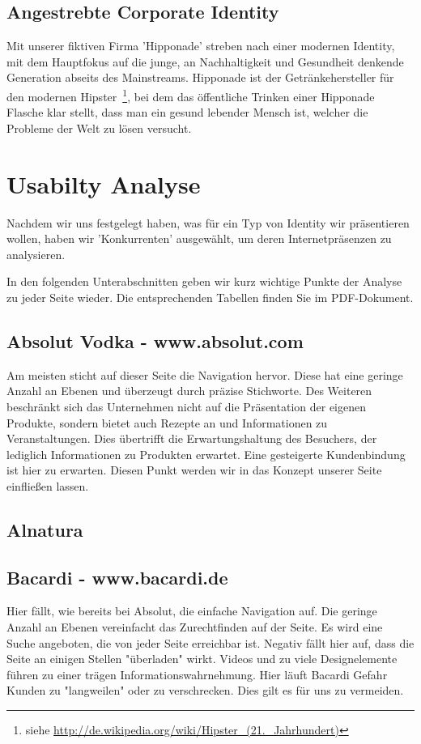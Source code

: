 \documentclass[12pt,a4paper,oneside,ngerman]{article}
\begin{document}
\subsection{Angestrebte Corporate Identity}
Mit unserer fiktiven Firma 'Hipponade' streben nach einer modernen Identity, mit dem Hauptfokus auf die junge, an Nachhaltigkeit und Gesundheit denkende Generation abseits des Mainstreams.
Hipponade ist der Getränkehersteller für den modernen Hipster~\footnote{siehe \url{http://de.wikipedia.org/wiki/Hipster_(21._Jahrhundert)}}, bei dem das öffentliche Trinken einer Hipponade Flasche klar stellt, dass man ein gesund lebender Mensch ist, welcher die Probleme der Welt zu lösen versucht.

\newpage %
\section{Usabilty Analyse} %
Nachdem wir uns festgelegt haben, was für ein Typ von Identity wir präsentieren wollen, haben wir 'Konkurrenten' ausgewählt, um deren Internetpräsenzen zu analysieren. 

In den folgenden Unterabschnitten geben wir kurz wichtige Punkte der Analyse zu jeder Seite wieder. Die entsprechenden Tabellen finden Sie im PDF-Dokument. %

\subsection{Absolut Vodka - www.absolut.com} %
Am meisten sticht auf dieser Seite die Navigation hervor. Diese hat eine geringe Anzahl an Ebenen und überzeugt durch präzise Stichworte. Des Weiteren beschränkt sich das Unternehmen nicht auf die Präsentation der eigenen Produkte, sondern bietet auch Rezepte an und Informationen zu Veranstaltungen. Dies übertrifft die Erwartungshaltung des Besuchers, der lediglich Informationen zu Produkten erwartet. Eine gesteigerte Kundenbindung ist hier zu erwarten. Diesen Punkt werden wir in das Konzept unserer Seite einfließen lassen.
\subsection{Alnatura} %

\subsection{Bacardi - www.bacardi.de} %
Hier fällt, wie bereits bei Absolut, die einfache Navigation auf. Die geringe Anzahl an Ebenen vereinfacht das Zurechtfinden auf der Seite. Es wird eine Suche angeboten, die von jeder Seite erreichbar ist. Negativ fällt hier auf, dass die Seite an einigen Stellen "überladen" wirkt. Videos und zu viele Designelemente führen zu einer trägen Informationswahrnehmung. Hier läuft Bacardi Gefahr Kunden zu "langweilen" oder zu verschrecken. Dies gilt es für uns zu vermeiden.
\end{document}
